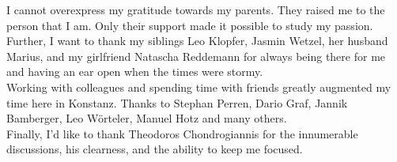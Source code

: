 I cannot overexpress my gratitude towards my parents.
They raised me to the person that I am.
Only their support made it possible to study my passion. \\

Further, I want to thank my siblings Leo Klopfer, Jasmin Wetzel, her husband Marius, and my girlfriend Natascha Reddemann for always being there for me and having an ear open when the times were stormy. \\

Working with colleagues and spending time with friends greatly augmented my time here in Konstanz. Thanks to Stephan Perren, Dario Graf, Jannik Bamberger, Leo Wörteler, Manuel Hotz and many others. \\


Finally, I'd like to thank Theodoros Chondrogiannis for the innumerable discussions, his clearness, and the ability to keep me focused. 
\vfill\hspace{0pt}
\newpage
